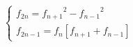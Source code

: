 $${\begin{cases}
{{ f_{2n}} = { f_{n + 1}}^2 - {f_{n - 1}}^2}\\
{{ f_{2n - 1}} = { f_n}[{ f_{n + 1}} + { f_{n - 1}}]}
\end{cases}}$$